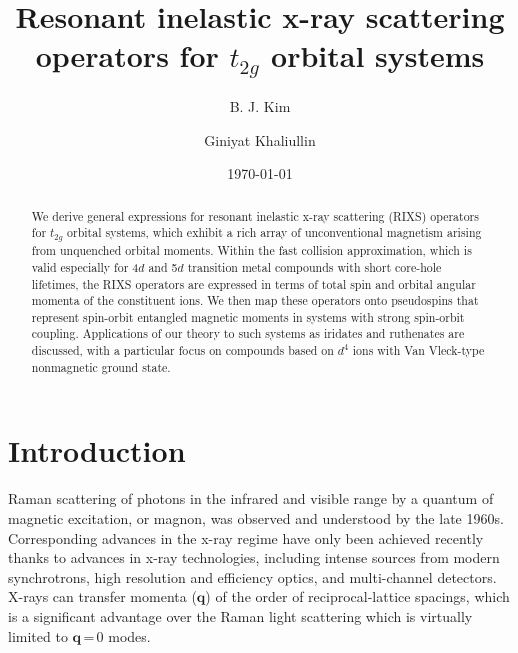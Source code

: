 \documentclass[twocolumn,prb,aps,showpacs,superscriptaddress]{revtex4-1}
\begin{document}
\title{Resonant inelastic x-ray scattering operators for $t_{2g}$ orbital 
systems}

\author{B. J. Kim}
\author{Giniyat Khaliullin}

\date{\today}

\begin{abstract}
We derive general expressions for resonant inelastic x-ray scattering (RIXS)
operators for $t_{2g}$ orbital systems, which exhibit a rich array of
unconventional magnetism arising from unquenched orbital moments. 
Within the fast collision approximation, which is valid especially for 4$d$ 
and 5$d$ transition metal compounds with short core-hole lifetimes, the RIXS
operators are expressed in terms of total spin and orbital angular momenta of
the constituent ions. We then map these operators onto pseudospins that 
represent spin-orbit entangled magnetic moments in systems with strong 
spin-orbit coupling. Applications of our theory to such systems as iridates 
and ruthenates are discussed, with a particular focus on compounds based 
on $d^4$ ions with Van Vleck-type nonmagnetic ground state.  

\end{abstract}


\maketitle
\section{Introduction}
Raman scattering of photons in the infrared and visible range by a quantum of
magnetic excitation, or magnon, was observed and understood by the late
1960s\cite{FL}. Corresponding advances in the x-ray regime\cite{AmentReview}
have only been achieved recently thanks to advances in x-ray technologies,
including intense sources from modern synchrotrons, high resolution and
efficiency optics, and multi-channel detectors. X-rays can transfer momenta
($\mathbf{q}$) of the order of  reciprocal-lattice spacings, which is a
significant advantage over the Raman light scattering which is virtually
limited to $\mathbf{q}$\,=\,0 modes.  
\end{document}
